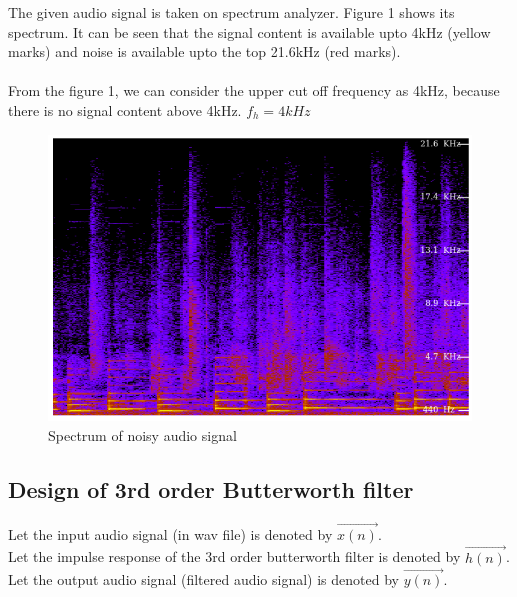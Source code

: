 \documentclass[journal,10pt,twocolumn]{article}
\begin{document}
\vspace{0.25cm}
The given audio signal is taken on spectrum analyzer. Figure 1 shows its spectrum. It can be seen that the signal content is available upto 4kHz (yellow marks) and noise is available upto the top 21.6kHz (red marks).\\
\vspace{0.25cm}\\
From the figure 1, we can consider the upper cut off frequency as 4kHz, because there is no signal content above 4kHz.
\center
$f_h = 4kHz$
\endcenter{}
\begin{figure}[h]
\includegraphics[width=1\columnwidth]{noisy.png}
\caption{Spectrum of noisy audio signal}
\label{fig:Spectrum of noisy audio signal}
\end{figure}
\begin{flushleft}


\section{Design of 3rd order Butterworth filter}
\vspace{0.25cm}
Let the input audio signal (in wav file) is denoted by $\vec{x(n)}$.\\  
\vspace{0.2cm}
Let the impulse response of the 3rd order butterworth filter is denoted by $\vec{h(n)}$.\\  
\vspace{0.2cm}
Let the output audio signal (filtered audio signal) is denoted by $\vec{y(n)}$.\\ 
\end{flushleft}
\vspace{0.25cm}
\end{document}
